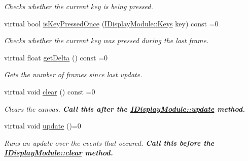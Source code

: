 \begin{DoxyCompactItemize}
\begin{DoxyCompactList}\small\item\em Checks whether the current key is being pressed. \end{DoxyCompactList}\item 
virtual bool \mbox{\hyperlink{classArcade_1_1Display_1_1IDisplayModule_a531b700b332e077d9b714bafac05ebe1}{is\+Key\+Pressed\+Once}} (\mbox{\hyperlink{classArcade_1_1Display_1_1IDisplayModule_a8da3f6b309ca0581473ae8cc8789b619}{I\+Display\+Module\+::\+Keys}} key) const =0
\begin{DoxyCompactList}\small\item\em Checks whether the current key was pressed during the last frame. \end{DoxyCompactList}\item 
virtual float \mbox{\hyperlink{classArcade_1_1Display_1_1IDisplayModule_aab078d82e6fdd32682553947c20226ac}{get\+Delta}} () const =0
\begin{DoxyCompactList}\small\item\em Gets the number of frames since last update. \end{DoxyCompactList}\item 
\mbox{\label{classArcade_1_1Display_1_1IDisplayModule_a4892b758c6710f45d4dcebe70f801639}} 
virtual void \mbox{\hyperlink{classArcade_1_1Display_1_1IDisplayModule_a4892b758c6710f45d4dcebe70f801639}{clear}} () const =0
\begin{DoxyCompactList}\small\item\em Clears the canvas. {\bfseries{Call this after the \mbox{\hyperlink{classArcade_1_1Display_1_1IDisplayModule_a1ca0c1052dccb78eb470e36e6f557e60}{I\+Display\+Module\+::update}} method.}} \end{DoxyCompactList}\item 
\mbox{\label{classArcade_1_1Display_1_1IDisplayModule_a1ca0c1052dccb78eb470e36e6f557e60}} 
virtual void \mbox{\hyperlink{classArcade_1_1Display_1_1IDisplayModule_a1ca0c1052dccb78eb470e36e6f557e60}{update}} ()=0
\begin{DoxyCompactList}\small\item\em Runs an update over the events that occured. {\bfseries{Call this before the \mbox{\hyperlink{classArcade_1_1Display_1_1IDisplayModule_a4892b758c6710f45d4dcebe70f801639}{I\+Display\+Module\+::clear}} method.}} \end{DoxyCompactList}\item 

\end{DoxyCompactItemize}
